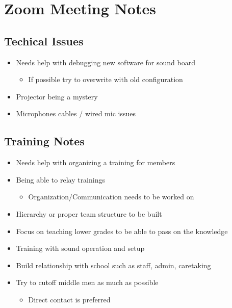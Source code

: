 \section{Zoom Meeting Notes}
\subsection{Techical Issues}
\begin{itemize}
    \item Needs help with debugging new software for sound board 
    \begin{itemize}
        \item If possible try to overwrite with old configuration 
    \end{itemize}
    \item Projector being a mystery 
    \item Microphones cables / wired mic issues 
\end{itemize}
\subsection{Training Notes}
\begin{itemize}
    \item Needs help with organizing a training for members 
    \item Being able to relay trainings 
    \begin{itemize}
        \item Organization/Communication needs to be worked on 
    \end{itemize}
    \item Hierarchy or proper team structure to be built 
    \item Focus on teaching lower grades to be able to pass on the knowledge 
    \item Training with sound operation and setup 
    \item Build relationship with school such as staff, admin, caretaking 
    \item Try to cutoff middle men as much as possible 
    \begin{itemize}
        \item Direct contact is preferred
    \end{itemize}
\end{itemize}

